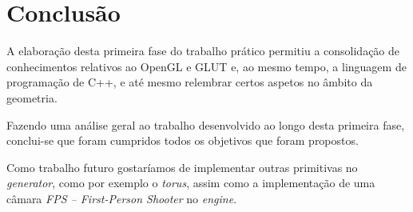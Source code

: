 \documentclass[a4paper, 11pt]{article}
\begin{document}
\section{Conclusão}

A elaboração desta primeira fase do trabalho prático permitiu a consolidação de conhecimentos 
relativos ao OpenGL e GLUT e, ao mesmo tempo, a linguagem de programação de C++, e até mesmo 
relembrar certos aspetos no âmbito da geometria.

Fazendo uma análise geral ao trabalho desenvolvido ao longo desta primeira fase, conclui-se que 
foram cumpridos todos os objetivos que foram propostos.

Como trabalho futuro gostaríamos de implementar outras primitivas no \textit{generator}, como por
exemplo  o \textit{torus}, assim como a implementação de uma câmara
\textit{FPS -- First-Person Shooter} no \textit{engine}.
\end{document}
